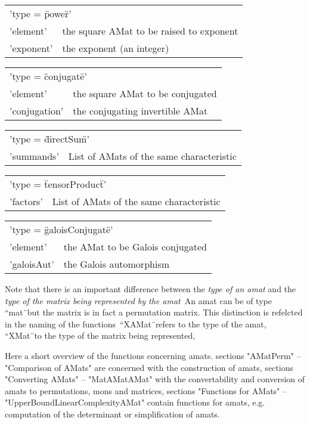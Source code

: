 \begin{tabular}{p{2.5cm}p{9cm}}
\multicolumn{2}{l}{'type = \"power\"\:'}\\
'element'      & the square AMat to be raised to exponent\\
'exponent'     & the exponent (an integer)
\end{tabular}

\begin{tabular}{p{2.5cm}p{9cm}}
\multicolumn{2}{l}{'type = \"conjugate\"\:'}\\
'element'      & the square AMat to be conjugated\\
'conjugation'  & the conjugating invertible AMat
\end{tabular}

\begin{tabular}{p{2.5cm}p{9cm}}
\multicolumn{2}{l}{'type = \"directSum\"\:'}\\
'summands'     & List of AMats of the same characteristic
\end{tabular}

\begin{tabular}{p{2.5cm}p{9cm}}
\multicolumn{2}{l}{'type = \"tensorProduct\"\:'}\\
'factors'      & List of AMats of the same characteristic
\end{tabular}

\begin{tabular}{p{2.5cm}p{9cm}}
\multicolumn{2}{l}{'type = \"galoisConjugate\"\:'}\\
'element'      & the AMat to be Galois conjugated\\
'galoisAut'    & the Galois automorphism
\end{tabular}

\bigskip
Note that there is an important difference between the 
{\em type of an amat} and the 
{\em type of the matrix being represented by the amat}\:\ 
An amat can be of type ``mat\"\ but the matrix is in fact
a permutation matrix. This distinction is refelcted in the naming
of the functions\:\ ``XAMat\"\ refers to the type of the 
amat, ``XMat\"\ to the type of the matrix being represented,

Here a short overview of the functions concerning amats. 
sections "AMatPerm" -- "Comparison of AMats" are concerned with
the construction of amats, sections "Converting AMats" -- "MatAMatAMat" 
with the convertability and conversion of amats to permutations, mons
and matrices, sections 
"Functions for AMats" -- "UpperBoundLinearComplexityAMat"
contain functions for amats, e.g. computation of the determinant or 
simplification of amats.

